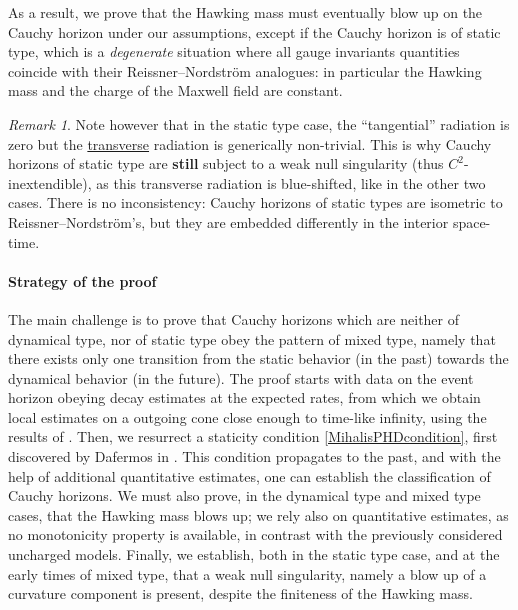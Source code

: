 \documentclass[10pt,a4paper]{article}
\theoremstyle{plain}
\theoremstyle{remark}
\newtheorem{rmk}{Remark}[section]
\theoremstyle{definition}
\theoremstyle{plain}
\theoremstyle{remark}
\theoremstyle{definition}
\numberwithin{equation}{section}
\begin{document}
 	As a result, we prove that the Hawking mass must eventually blow up on the Cauchy horizon under our assumptions, except if the Cauchy horizon is of static type, which is a \textit{degenerate} situation where all gauge invariants quantities coincide with their Reissner--Nordstr\"{o}m analogues: in particular the Hawking mass and the charge of the Maxwell field are constant. \begin{rmk} \label{remarktransverse}
 		Note however that in the static type case, the ``tangential'' radiation is zero but the \underline{transverse} radiation is generically non-trivial. This is why Cauchy horizons of static type are \textbf{still} subject to a weak null singularity (thus $C^2$-inextendible), as this transverse radiation is blue-shifted, like in the other two cases. There is no inconsistency: Cauchy horizons of static types are isometric to Reissner--Nordstr\"{o}m's, but they are embedded differently in the interior space-time.
 	\end{rmk}
 	
 	\paragraph{Strategy of the proof} The main challenge is to prove that Cauchy horizons which are neither of dynamical type, nor of static type obey the pattern of mixed type, namely that there exists only one transition from the static behavior (in the past) towards the dynamical behavior (in the future). The proof starts with data on the event horizon obeying decay estimates at the expected rates, from which we obtain local estimates on a outgoing cone close enough to time-like infinity, using the results of \cite{Moi}. Then, we resurrect a staticity condition \eqref{MihalisPHDcondition}, first discovered by Dafermos in \cite{MihalisPHD}. This condition propagates to the past, and with the help of additional quantitative estimates, one can establish the classification of Cauchy horizons. We must also prove, in the dynamical type and mixed type cases, that the Hawking mass blows up; we rely also on quantitative estimates, as no monotonicity property is available, in contrast with the previously considered uncharged models. Finally, we establish, both in the static type case, and at the early times of mixed type, that a weak null singularity, namely a blow up of a curvature component is present, despite the finiteness of the Hawking mass.
 	
\end{document}
